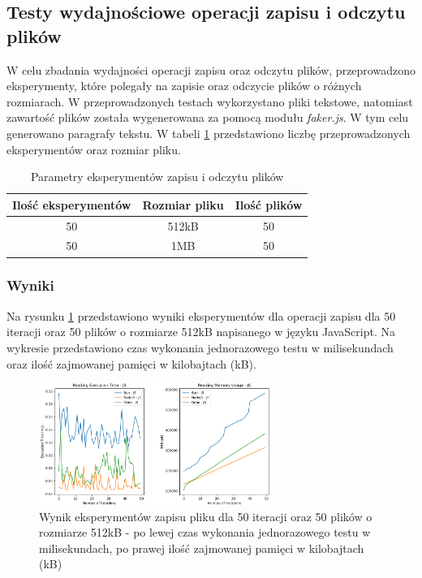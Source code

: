 \subsection{Testy wydajnościowe operacji zapisu i odczytu plików}
W celu zbadania wydajności operacji zapisu oraz odczytu plików, przeprowadzono eksperymenty, które polegały na zapisie oraz odczycie plików o różnych rozmiarach. W przeprowadzonych testach wykorzystano pliki tekstowe, natomiast zawartość plików została wygenerowana za pomocą modułu \textit{faker.js}. W tym celu generowano paragrafy tekstu. W tabeli \ref{tab:file_experiments} przedstawiono liczbę przeprowadzonych eksperymentów oraz rozmiar pliku.

\begin{table}[H]
  \centering
  \caption{Parametry eksperymentów zapisu i odczytu plików}
  \begin{tabular}{|c|c|c|}
    \hline
    \textbf{Ilość eksperymentów} & \textbf{Rozmiar pliku} & \textbf{Ilość plików} \\ \hline
    50 & 512kB & 50 \\ \hline
    50 & 1MB & 50 \\ \hline
  \end{tabular}
  \label{tab:file_experiments}
\end{table}

\subsubsection{Wyniki}
Na rysunku \ref{fig:file_e1_reading_js} przedstawiono wyniki eksperymentów dla operacji zapisu dla 50 iteracji oraz 50 plików o rozmiarze 512kB napisanego w języku JavaScript. Na wykresie przedstawiono czas wykonania jednorazowego testu w milisekundach oraz ilość zajmowanej pamięci w kilobajtach (kB).

\begin{figure}[H]
  \centering
  \includegraphics[width=0.68\textwidth]{Figures/files/files_reading_50_500_50_js.png}
  \caption{Wynik eksperymentów zapisu pliku dla 50 iteracji oraz 50 plików o rozmiarze 512kB - po lewej czas wykonania jednorazowego testu w milisekundach, po prawej ilość zajmowanej pamięci w kilobajtach (kB)}
  \label{fig:file_e1_reading_js}
\end{figure}

